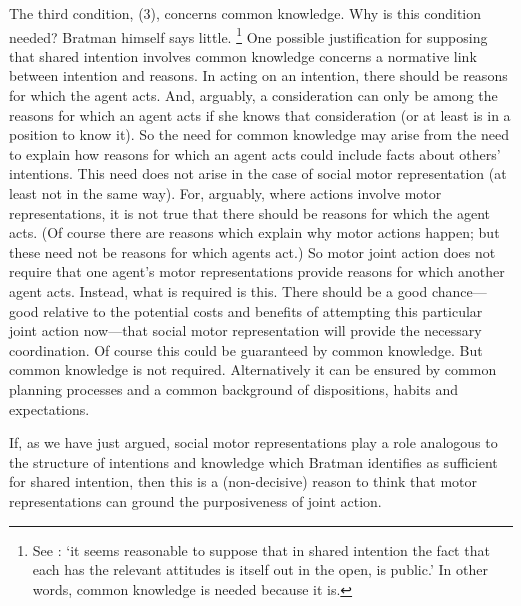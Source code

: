 \documentclass[12pt,\papersize]{extarticle}
\begin{document}
The third condition, (3), concerns common knowledge.
Why is this condition needed?
Bratman himself says little.%
\footnote{
See \citet[p.\ 117]{Bratman:1993je}:
`it seems reasonable to suppose that in shared intention the fact that each has the relevant attitudes is itself out in the open, is public.' 
In other words, common knowledge is needed because it is.
}
One possible justification for supposing that shared intention involves common knowledge concerns a normative link between intention and reasons.
In acting on an intention, there should be reasons for which the  agent acts.
And, arguably, a consideration can only be among the reasons for which an agent acts if she knows that consideration (or at least is in a position to know it).
So the need for common knowledge may arise from the need to explain how reasons for which an agent acts could include facts about others' intentions.
This need does not arise in the case of social motor representation (at least not in the same way).
For, arguably, where actions involve motor representations, it is not true that there should be reasons for which the agent acts.
(Of course there are reasons which explain why motor actions happen; but these need not be reasons for which agents act.)
So motor joint action does not require that one agent's motor representations provide reasons for which another agent acts.
Instead, what is required is this.
There should be a good chance---good relative to the potential costs and benefits of attempting this particular joint action now---that social motor representation will provide the necessary coordination.
Of course this could be guaranteed by common knowledge. 
But common knowledge is not required.
Alternatively it can be ensured by common planning processes and a common {background} of dispositions, habits and expectations. 

If, as we have just argued, social motor representations play a role analogous to the structure of intentions and knowledge which Bratman identifies as sufficient for shared intention, then this is a  (non-decisive)  reason to think that motor representations can ground the purposiveness of joint action.
\end{document}
